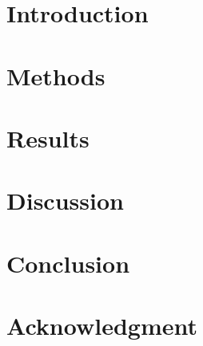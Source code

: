 \documentclass[10pt,subscriptcorrection,upint,varvw,barcolor=Goldenrod3,mathalfa=cal=euler,balance,hyphenate,french,pdf-a, nolists,nofoot]  %
{asmejour} %
\begin{document}
\begin{abstract}
    
\end{abstract} 


\maketitle %



\section{Introduction}


\section{Methods}


\section{Results}


\section{Discussion}


\section{Conclusion}


\section*{Acknowledgment} %

\end{document}
